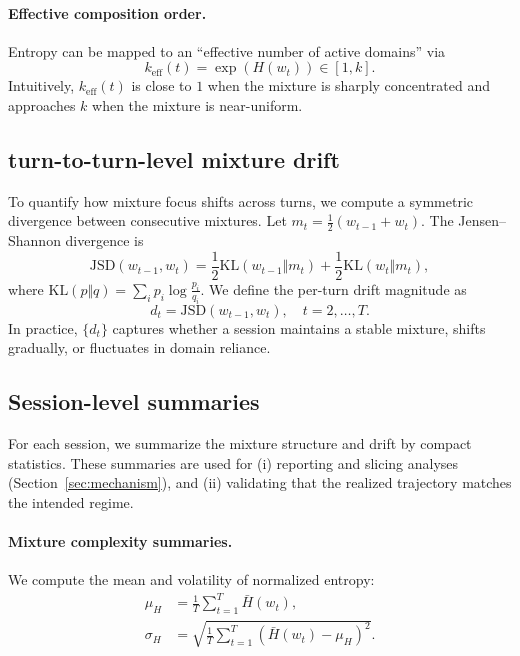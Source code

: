 \paragraph{Effective composition order.}
Entropy can be mapped to an ``effective number of active domains'' via
\begin{equation}
\label{eq:effective_k}
k_{\mathrm{eff}}(t)=\exp\!\left(H\left(w_t\right)\right)\in[1,k].
\end{equation}
Intuitively, $k_{\mathrm{eff}}(t)$ is close to $1$ when the mixture is sharply concentrated
and approaches $k$ when the mixture is near-uniform.

\subsection{turn-to-turn-level mixture drift}
To quantify how mixture focus shifts across turns, we compute a symmetric divergence between consecutive
mixtures. Let $m_t=\frac{1}{2}(w_{t-1}+w_t)$. The Jensen--Shannon divergence is~\citep{lin1991divergence}
\vspace{-1mm}
\begin{equation}
\label{eq:jsd_def}
\mathrm{JSD}(w_{t-1},w_t)
=\frac{1}{2}\mathrm{KL}\left(w_{t-1}\Vert m_t\right) 
+\frac{1}{2}\mathrm{KL}\left(w_t\Vert m_t\right),
\end{equation}
\vspace{-1mm}
where $\mathrm{KL}\left(p\Vert q\right)=\sum_i p_i\log\frac{p_i}{q_i}$.
We define the per-turn drift magnitude as
\vspace{-1mm}
\begin{equation}
\label{eq:drift_mag}
d_t=\mathrm{JSD}\left(w_{t-1},w_t\right),\quad t=2,\ldots,T.
\end{equation}
\vspace{-1mm}
In practice, $\{d_t\}$ captures whether a session maintains a stable mixture,
shifts gradually, or fluctuates in domain reliance.

\subsection{Session-level summaries}
For each session, we summarize the mixture structure and drift by compact statistics.
These summaries are used for (i) reporting and slicing analyses (Section~\ref{sec:mechanism}),
and (ii) validating that the realized trajectory matches the intended regime.

\paragraph{Mixture complexity summaries.}
We compute the mean and volatility of normalized entropy:
\begin{align}
\label{eq:ep_entropy_mean}
\mu_H &= \frac{1}{T}\sum_{t=1}^{T}\bar{H}(w_t),\\
\label{eq:ep_entropy_std}
\sigma_H &= \sqrt{\frac{1}{T}\sum_{t=1}^{T}\left(\bar{H}\left(w_t\right)-\mu_H\right)^2 }.
\end{align}

